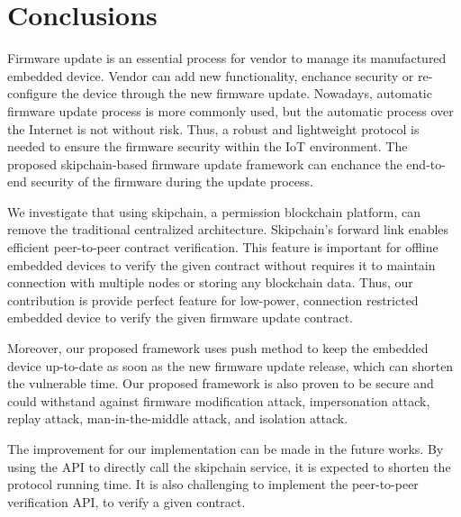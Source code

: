 \chapter{Conclusions}
\label{cha:6_conclusions}

Firmware update is an essential process for vendor to manage its manufactured embedded device. Vendor can add new functionality, enchance security or re-configure the device through the new firmware update. Nowadays, automatic firmware update process is more commonly used, but the automatic process over the Internet is not without risk. Thus, a robust and lightweight protocol is needed to ensure the firmware security within the IoT environment. The proposed skipchain-based firmware update framework can enchance the end-to-end security of the firmware during the update process.

We investigate that using skipchain, a permission blockchain platform, can remove the traditional centralized architecture. Skipchain's forward link enables efficient peer-to-peer contract verification. This feature is important for offline embedded devices to verify the given contract without requires it to maintain connection with multiple nodes or storing any blockchain data. Thus, our contribution is provide perfect feature for low-power, connection restricted embedded device to verify the given firmware update contract.

Moreover, our proposed framework uses push method to keep the embedded device up-to-date as soon as the new firmware update release, which can shorten the vulnerable time. Our proposed framework is also proven to be secure and could withstand against firmware modification attack, impersonation attack, replay attack, man-in-the-middle attack, and isolation attack.

The improvement for our implementation can be made in the future works. By using the API to directly call the skipchain service, it is expected to shorten the protocol running time. It is also challenging to implement the peer-to-peer verification API, to verify a given contract.
